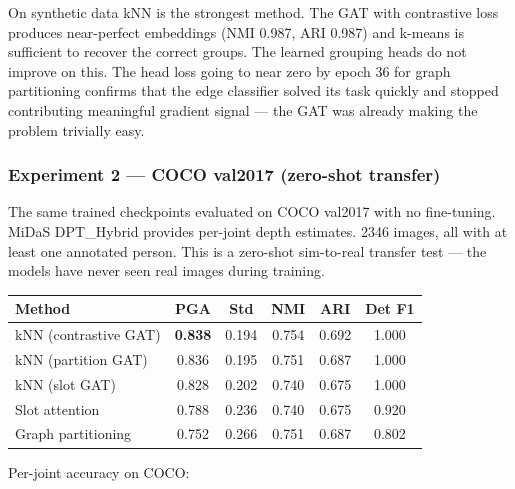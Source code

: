 On synthetic data kNN is the strongest method. The GAT with contrastive loss produces near-perfect embeddings (NMI 0.987, ARI 0.987) and k-means is sufficient to recover the correct groups. The learned grouping heads do not improve on this. The head loss going to near zero by epoch 36 for graph partitioning confirms that the edge classifier solved its task quickly and stopped contributing meaningful gradient signal --- the GAT was already making the problem trivially easy.


\subsubsection{Experiment 2 --- COCO val2017 (zero-shot transfer)}

The same trained checkpoints evaluated on COCO val2017 with no fine-tuning. MiDaS DPT\_Hybrid provides per-joint depth estimates. 2346 images, all with at least one annotated person. This is a zero-shot sim-to-real transfer test --- the models have never seen real images during training.

\begin{center}
\begin{tabular}{lccccc}
\toprule
Method & PGA & Std & NMI & ARI & Det F1 \\
\midrule
kNN (contrastive GAT) & \textbf{0.838} & 0.194 & 0.754 & 0.692 & 1.000 \\
kNN (partition GAT) & 0.836 & 0.195 & 0.751 & 0.687 & 1.000 \\
kNN (slot GAT) & 0.828 & 0.202 & 0.740 & 0.675 & 1.000 \\
Slot attention & 0.788 & 0.236 & 0.740 & 0.675 & 0.920 \\
Graph partitioning & 0.752 & 0.266 & 0.751 & 0.687 & 0.802 \\
\bottomrule
\end{tabular}
\end{center}

Per-joint accuracy on COCO:

